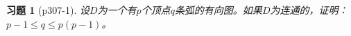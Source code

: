 \documentclass{article}
\begin{document}
\begin{CJK}{UTF8}{gbsn}
  \newtheorem*{Exercise}{习题}
  \huge
\begin{Exercise}[p307-1]
  设$D$为一个有$p$个顶点$q$条弧的有向图。如果$D$为连通的，证明：$p-1\leq q \leq p(p-1)$。
\end{Exercise}

\end{CJK}
\end{document}

